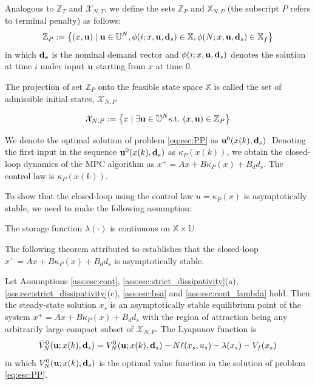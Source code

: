 Analogous to $\mathbb{Z}_T$ and $\mathcal{X}_{N,T}$, we define the
sets $\mathbb{Z}_P$ and $\mathbb{X}_{N,P}$ (the subscript $P$ refers
to terminal penalty) as follows:
\[ \mathbb{Z}_P := \left\lbrace (x,\mathbf{u}) \mid  \mathbf{u} \in \mathbb{U}^N,
 \phi(i;x,\mathbf{u},\mathbf{d}_s) \in \mathbb{X},  \phi(N;x,\mathbf{u},\mathbf{d}_s) \in \mathbb{X}_f \right\rbrace\]
in which $\mathbf{d}_s$ is the nominal demand vector and
$\phi(i;x,\mathbf{u},\mathbf{d}_s)$ denotes the solution at time $i$ under input
$\mathbf{u}$ starting from $x$ at time $0$. 

The projection of set $\mathbb{Z}_P$ onto the feasible state space
$\mathbb{X}$ is called the set of admissible initial states,
$\mathcal{X}_{N,P}$

\[\mathcal{X}_{N,P} := \left\lbrace x \mid \exists \mathbf{u} \in \mathbb{U}^N
  \text{s.t.~} (x,\mathbf{u}) \in \mathbb{Z}_P \right\rbrace \]

We denote the optimal solution of problem \eqref{eq:esc:PP} as
$\mathbf{u}^0(x(k),\mathbf{d}_s)$. Denoting the first input in the sequence
$\mathbf{u}^0(x(k),\mathbf{d}_s)$ as $\kappa_P(x(k))$, we obtain the closed-loop
dynamics of the MPC algorithm as $x^+ = Ax+B\kappa_P(x)+B_dd_s$.  The
control law is $\kappa_P(x(k))$.

To show that the closed-loop using the control law $u = \kappa_P(x)$
is asymptotically stable, we need to make the following  assumption:

\begin{assumption}
\label{ass:esc:cont_lambda}
The storage function $\lambda(\cdot)$ is continuous on $\mathbb{X}
\times  \mathbb{U}$
\end{assumption}

The following theorem attributed to \citet{amrit:rawlings:angeli:2011}
establishes that the closed-loop $x^+ = Ax+B\kappa_P(x)+B_dd_s$ is
asymptotically stable.

\begin{theorem}
Let Assumptions \ref{ass:esc:cont}, \ref{ass:esc:strict_dissipativity}(a),
\ref{ass:esc:strict_dissipativity}(c), \ref{ass:esc:bsa} and
\ref{ass:esc:cont_lambda} hold. Then the steady-state solution $x_s$ is an
asymptotically stable equilibrium point of the system
$x^+=Ax+B\kappa_P(x)+B_dd_s$ with the region of attraction being any
arbitrarily large compact subset of $\mathcal{X}_{N,P}$. The Lyapunov
function is 
\begin{equation*}
\bar{V}_N^0(\mathbf{u};x(k),\mathbf{d}_s) =
V_N^0(\mathbf{u};x(k),\mathbf{d}_s)-N\ell(x_s,u_s)-\lambda(x_s)-V_f(x_s)
\end{equation*}
in which $V_N^0(\mathbf{u};x(k),\mathbf{d}_s)$ is the optimal value function in the solution
of problem \eqref{eq:esc:PP}.
\end{theorem}

